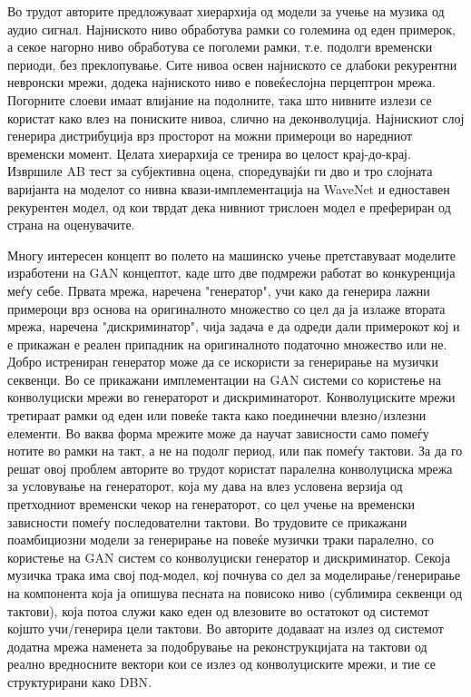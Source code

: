 Во трудот \cite{Mehri2016} авторите предложуваат хиерархија од модели за учење на музика од аудио сигнал. Најниското ниво обработува рамки со големина од еден примерок, а секое нагорно ниво обработува се поголеми рамки, т.е. подолги временски периоди, без преклопување. Сите нивоа освен најниското се длабоки рекурентни невронски мрежи, додека најниското ниво е повеќеслојна перцептрон мрежа. Погорните слоеви имаат влијание на подолните, така што нивните излези се користат како влез на пониските нивоа, слично на деконволуција. Најнискиот слој генерира дистрибуција врз просторот на можни примероци во наредниот временски момент. Целата хиерархија се тренира во целост крај-до-крај. Извршиле AB тест за субјективна оцена, споредувајќи ги дво и тро слојната варијанта на моделот со нивна квази-имплементација на WaveNet \cite{Oord2016} и едноставен рекурентен модел, од кои тврдат дека нивниот трислоен модел е префериран од страна на оценувачите.

Многу интересен концепт во полето на машинско учење претставуваат моделите изработени на GAN концептот, каде што две подмрежи работат во конкуренција меѓу себе. Првата мрежа, наречена "генератор", учи како да генерира лажни примероци врз основа на оригиналното множество со цел да ја излаже втората мрежа, наречена "дискриминатор", чија задача е да одреди дали примерокот кој и е прикажан е реален припадник на оригиналното податочно множество или не. Добро истрениран генератор може да се искористи за генерирање на музички секвенци. Во \cite{Yang2017,Dong2017,Dong2018} се прикажани имплементации на GAN системи со користење на конволуциски мрежи во генераторот и дискриминаторот. Конволуциските мрежи третираат рамки од еден или повеќе такта како поединечни влезно/излезни елементи. Во ваква форма мрежите може да научат зависности само помеѓу нотите во рамки на такт, а не на подолг период, или пак помеѓу тактови. За да го решат овој проблем авторите во трудот \cite{Yang2017} користат паралелна конволуциска мрежа за условување на генераторот, која му дава на влез условена верзија од претходниот временски чекор на генераторот, со цел учење на временски зависности помеѓу последователни тактови. Во трудовите \cite{Dong2017,Dong2018} се прикажани поамбициозни модели за генерирање на повеќе музички траки паралелно, со користење на GAN систем со конволуциски генератор и дискриминатор. Секоја музичка трака има свој под-модел, кој почнува со дел за моделирање/генерирање на компонента која ја опишува песната на повисоко ниво (сублимира секвенци од тактови), која потоа служи како еден од влезовите во остатокот од системот којшто учи/генерира цели тактови. Во \cite{Dong2018} авторите додаваат на излез од системот додатна мрежа наменета за подобрување на реконструкцијата на тактови од реално вредносните вектори кои се излез од конволуциските мрежи, и тие се структурирани како DBN.

